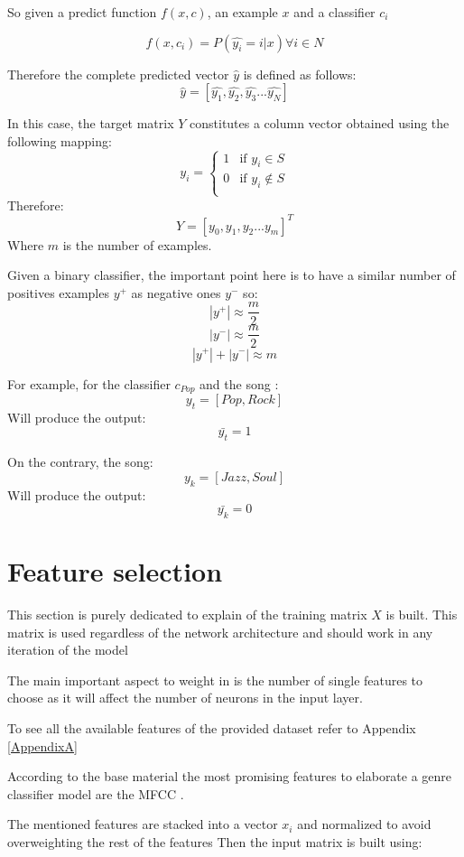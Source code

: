 So given a predict function  $f(x, c)$, an example $x$ and a classifier $c_i$ 

$$ f(x, c_i) =  P(\hat{y_i} = i | x) \forall i \in N $$

Therefore the complete predicted vector $\hat{y}$ is defined as follows:
$$ \hat{y} = [ \hat{y_1}, \hat{y_2}, \hat{y_3} ... \hat{y_N} ] $$

In this case, the target matrix \(Y\) constitutes a column vector obtained using the following mapping:
$$ {y_i} =
\begin{cases}
    1 & \text{if } y_i \in S\\
    0 & \text{if } y_i \notin S\\
\end{cases}
$$
Therefore:
$$ Y = [y_0, y_1, y_2 ... y_m]^T $$
Where $m$ is the number of examples.

Given a binary classifier, the important point here is to have a similar number of positives examples $y^+$ as negative ones $y^-$ so:
$$ |y^+|  \approx \frac{m}{2} $$
$$ |y^-|  \approx \frac{m}{2} $$
$$ |y^+| + |y^-| \approx m $$

For example, for the classifier $c_{Pop}$ and the song :
$$ y_t  = [ Pop, Rock ] $$
Will produce the output:
$$ \bar{y_t}  = 1 $$

On the contrary, the song:
$$ y_k  = [ Jazz, Soul ] $$
Will produce the output:
$$ \bar{y_k}  = 0 $$


\section{Feature selection}
This section is purely dedicated to explain of the training matrix $X$ is built.
This matrix is used regardless of the network architecture and should work in any iteration of the model

The main important aspect to weight in is the number of single features to choose as it will affect the number of neurons in the input layer.

To see all the available features of the provided dataset refer to Appendix \ref{AppendixA}

According to the base material the most promising features to elaborate a genre classifier model are the MFCC \cite{Jensen2006} \cite{Li2011}.

The mentioned features are stacked into a vector $x_i$ and normalized to avoid overweighting the rest of the features 
Then the input matrix is built using:

